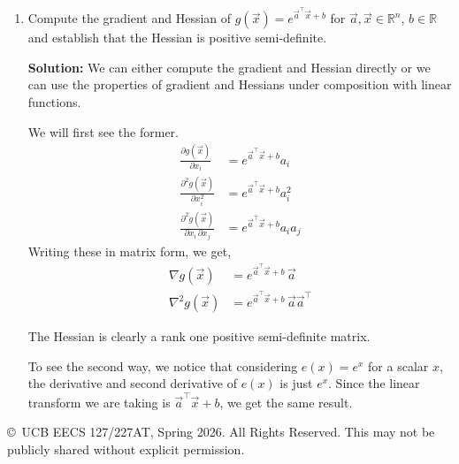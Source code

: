\documentclass[10pt]{article}
\newcommand{\RR}{\mathbb{R}}
\begin{document}
\begin{enumerate}[label=(\alph*)]
\item Compute the gradient and Hessian of $g(\vec{x}) = e^{\vec{a}^\top \vec{x} + b}$ for $\vec{a}, \vec{x} \in \RR^n$, $b \in \RR$ and establish that the Hessian is positive semi-definite.

\textbf{Solution:} We can either compute the gradient and Hessian directly or we can use the properties of gradient and Hessians under composition with linear functions.

We will first see the former.
\begin{align*}
\frac{\partial g(\vec{x})}{\partial x_i} &= e^{\vec{a}^\top \vec{x} + b} a_i \\[4pt]
\frac{\partial^2 g(\vec{x})}{\partial x_i^2} &= e^{\vec{a}^\top \vec{x} + b} a_i^2 \\[4pt]
\frac{\partial^2 g(\vec{x})}{\partial x_i \, \partial x_j} &= e^{\vec{a}^\top \vec{x} + b} a_i a_j
\end{align*}
Writing these in matrix form, we get,
\begin{align}
\nabla g(\vec{x}) &= e^{\vec{a}^\top \vec{x} + b} \, \vec{a} \\
\nabla^2 g(\vec{x}) &= e^{\vec{a}^\top \vec{x} + b} \, \vec{a} \vec{a}^\top
\end{align}

The Hessian is clearly a rank one positive semi-definite matrix.

To see the second way, we notice that considering $e(x) = e^x$ for a scalar $x$, the derivative and second derivative of $e(x)$ is just $e^x$. Since the linear transform we are taking is $\vec{a}^\top \vec{x} + b$, we get the same result.
\end{enumerate}

\vfill
\begin{center}
\small \copyright\ UCB EECS 127/227AT, Spring 2026. All Rights Reserved. This may not be publicly shared without explicit permission.
\end{center}
\end{document}
